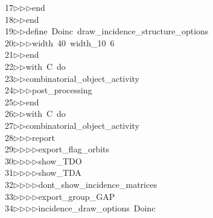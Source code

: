 \begin{tabbing}
17\>$\triangleright$\>$\triangleright$\>$\triangleright$\>end\ \\[0pt]
18\>$\triangleright$\>$\triangleright$\>end\ \\[0pt]
19\>$\triangleright$\>$\triangleright$\>define\ Doinc\ draw\_incidence\_structure\_options\ \\[0pt]
20\>$\triangleright$\>$\triangleright$\>$\triangleright$\>width\ 40\ width\_10\ 6\ \\[0pt]
21\>$\triangleright$\>$\triangleright$\>end\ \\[0pt]
22\>$\triangleright$\>$\triangleright$\>with\ C\ do\ \\[0pt]
23\>$\triangleright$\>$\triangleright$\>combinatorial\_object\_activity\ \\[0pt]
24\>$\triangleright$\>$\triangleright$\>$\triangleright$\>post\_processing\ \\[0pt]
25\>$\triangleright$\>$\triangleright$\>end\ \\[0pt]
26\>$\triangleright$\>$\triangleright$\>with\ C\ do\ \\[0pt]
27\>$\triangleright$\>$\triangleright$\>combinatorial\_object\_activity\ \\[0pt]
28\>$\triangleright$\>$\triangleright$\>$\triangleright$\>report\ \\[0pt]
29\>$\triangleright$\>$\triangleright$\>$\triangleright$\>$\triangleright$\>export\_flag\_orbits\ \\[0pt]
30\>$\triangleright$\>$\triangleright$\>$\triangleright$\>$\triangleright$\>show\_TDO\ \\[0pt]
31\>$\triangleright$\>$\triangleright$\>$\triangleright$\>$\triangleright$\>show\_TDA\ \\[0pt]
32\>$\triangleright$\>$\triangleright$\>$\triangleright$\>$\triangleright$\>dont\_show\_incidence\_matrices\ \\[0pt]
33\>$\triangleright$\>$\triangleright$\>$\triangleright$\>$\triangleright$\>export\_group\_GAP\ \\[0pt]
34\>$\triangleright$\>$\triangleright$\>$\triangleright$\>$\triangleright$\>incidence\_draw\_options\ Doinc\ \\[0pt]

\end{tabbing}
